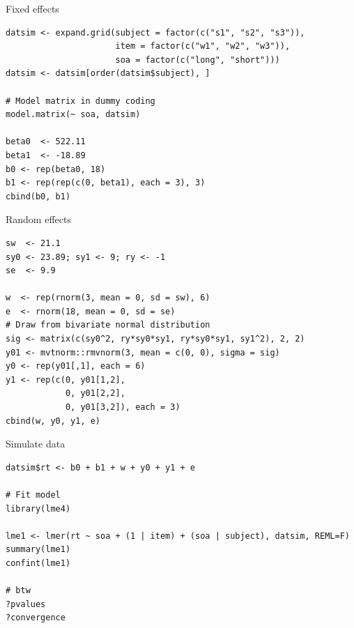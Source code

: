\documentclass[aspectratio=169]{beamer}
\begin{document}
{

\begin{frame}[fragile]{Fixed effects}
  \begin{lstlisting}
datsim <- expand.grid(subject = factor(c("s1", "s2", "s3")),
                      item = factor(c("w1", "w2", "w3")),
                      soa = factor(c("long", "short")))
datsim <- datsim[order(datsim$subject), ]

# Model matrix in dummy coding
model.matrix(~ soa, datsim)

beta0  <- 522.11
beta1  <- -18.89
b0 <- rep(beta0, 18)
b1 <- rep(rep(c(0, beta1), each = 3), 3)
cbind(b0, b1)
  \end{lstlisting}
\end{frame}

\begin{frame}[fragile]{Random effects}
  \begin{lstlisting}
sw  <- 21.1
sy0 <- 23.89; sy1 <- 9; ry <- -1
se  <- 9.9

w  <- rep(rnorm(3, mean = 0, sd = sw), 6)
e  <- rnorm(18, mean = 0, sd = se)
# Draw from bivariate normal distribution
sig <- matrix(c(sy0^2, ry*sy0*sy1, ry*sy0*sy1, sy1^2), 2, 2)
y01 <- mvtnorm::rmvnorm(3, mean = c(0, 0), sigma = sig)
y0 <- rep(y01[,1], each = 6)
y1 <- rep(c(0, y01[1,2],
            0, y01[2,2],
            0, y01[3,2]), each = 3)
cbind(w, y0, y1, e)
  \end{lstlisting}
\end{frame}

\begin{frame}[fragile]{Simulate data}
  \begin{lstlisting}
datsim$rt <- b0 + b1 + w + y0 + y1 + e

# Fit model
library(lme4)

lme1 <- lmer(rt ~ soa + (1 | item) + (soa | subject), datsim, REML=F)
summary(lme1)
confint(lme1)

# btw
?pvalues
?convergence
  \end{lstlisting}
\end{frame}

}
\end{document}
